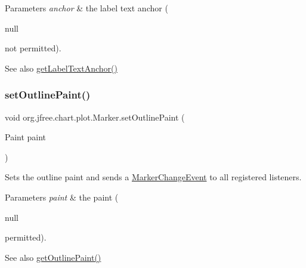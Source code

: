 \begin{DoxyParams}{Parameters}
{\em anchor} & the label text anchor (
\begin{DoxyCode}
null 
\end{DoxyCode}
 not permitted).\\
\hline
\end{DoxyParams}
\begin{DoxySeeAlso}{See also}
\mbox{\hyperlink{classorg_1_1jfree_1_1chart_1_1plot_1_1_marker_a24f2b2bcafa9ccc520dd4c52c074e985}{get\+Label\+Text\+Anchor()}} 
\end{DoxySeeAlso}
\mbox{\label{classorg_1_1jfree_1_1chart_1_1plot_1_1_marker_a1be6737e5fd64b728309cc4dcc08e9b3}} 
\subsubsection{\texorpdfstring{set\+Outline\+Paint()}{setOutlinePaint()}}
{\footnotesize\ttfamily void org.\+jfree.\+chart.\+plot.\+Marker.\+set\+Outline\+Paint (\begin{DoxyParamCaption}\item[{Paint}]{paint }\end{DoxyParamCaption})}

Sets the outline paint and sends a \mbox{\hyperlink{}{Marker\+Change\+Event}} to all registered listeners.


\begin{DoxyParams}{Parameters}
{\em paint} & the paint (
\begin{DoxyCode}
null 
\end{DoxyCode}
 permitted).\\
\hline
\end{DoxyParams}
\begin{DoxySeeAlso}{See also}
\mbox{\hyperlink{classorg_1_1jfree_1_1chart_1_1plot_1_1_marker_a36e985c2203c98a8da657b5bd1fd6c67}{get\+Outline\+Paint()}} 
\end{DoxySeeAlso}
\mbox{\label{classorg_1_1jfree_1_1chart_1_1plot_1_1_marker_a6b74fd1bc29c013360dff5775f1ef8f3}} 
